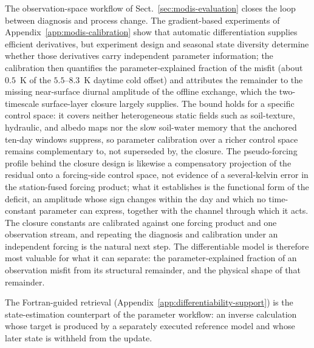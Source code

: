 \documentclass[gmd, manuscript]{copernicus}
\begin{document}
The observation-space workflow of Sect.~\ref{sec:modis-evaluation} closes
the loop between diagnosis and process change. The gradient-based
experiments of Appendix~\ref{app:modis-calibration} show that automatic
differentiation supplies efficient derivatives, but experiment design and
seasonal state diversity determine whether those derivatives carry
independent parameter information; the calibration then quantifies the
parameter-explained fraction of the misfit (about $0.5$~K of the
$5.5$--$8.3$~K daytime cold offset) and attributes the remainder to the
missing near-surface diurnal amplitude of the offline exchange, which the
two-timescale surface-layer closure largely supplies. The bound holds for a
specific control space: it covers neither heterogeneous static fields such as
soil-texture, hydraulic, and albedo maps nor the slow soil-water memory
that the anchored ten-day windows suppress, so parameter calibration over a
richer control space remains complementary to, not superseded by, the
closure. The pseudo-forcing profile behind the closure design is likewise a
compensatory projection of the residual onto a forcing-side control space,
not evidence of a several-kelvin error in the station-fused forcing
product; what it establishes is the functional form of the deficit, an
amplitude whose sign changes within the day and which no time-constant
parameter can express, together with the channel through which it acts. The
closure constants are calibrated against one forcing product and one
observation stream, and repeating the diagnosis and calibration under an
independent forcing is the natural next step. The differentiable model is
therefore most valuable for what it can separate: the parameter-explained
fraction of an observation misfit from its structural remainder, and the
physical shape of that remainder.

The Fortran-guided retrieval (Appendix~\ref{app:differentiability-support})
is the state-estimation counterpart of the parameter workflow: an inverse
calculation whose target is produced by a separately executed reference model
and whose later state is withheld from the update.

\conclusions
\end{document}
